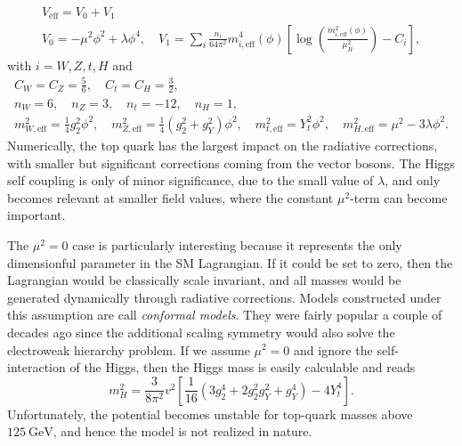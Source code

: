 \begin{equation}
\begin{gathered}
V_\text{eff} = V_0 + V_1\\
V_0 = - \mu^2 \phi^2 + \lambda \phi^4, \quad V_1 = \sum_{i} \frac{n_i}{64 \pi^2} m_{i, \text{eff}}^4(\phi) \left[ \log\! \left( \frac{m_{i, \text{eff}}^2 (\phi)}{\mu_R^2} \right) - C_i \right],
\end{gathered}
\end{equation}
with $i = W,Z, t, H$ and
\begin{equation}
\begin{gathered}
C_W = C_Z = \frac{5}{6}, \quad C_t = C_H = \frac{3}{2}, \\
n_W = 6, \quad n_Z = 3, \quad n_t = -12, \quad n_H = 1, \\
m_{W, \text{eff}}^2 = \frac{1}{4} g_2^2 \phi^2, \quad m_{Z, \text{eff}}^2 = \frac{1}{4} \left(g_2^2 + g_Y^2 \right) \phi^2, \quad m_{t, \text{eff}}^2 = Y_t^2 \phi^2, \quad m_{H, \text{eff}}^2 = \mu^2 - 3 \lambda \phi^2.
\end{gathered}
\label{eq:3:Veff_params}
\end{equation}
Numerically, the top quark has the largest impact on the radiative corrections, with smaller but significant corrections coming from the vector bosons. The Higgs self coupling is only of minor significance, due to the small value of $\lambda$, and only becomes relevant at smaller field values, where the constant $\mu^2$-term can become important.

The $\mu^2 = 0$ case is particularly interesting because it represents the only dimensionful parameter in the \acs{SM} Lagrangian. If it could be set to zero, then the Lagrangian would be classically scale invariant, and all masses would be generated dynamically through radiative corrections. Models constructed under this assumption are call \textit{conformal models}. They were fairly popular a couple of decades ago since the additional scaling symmetry would also solve the electroweak hierarchy problem. If we assume $\mu^2 = 0$ and ignore the self-interaction of the Higgs, then the Higgs mass is easily calculable and reads
\begin{equation}
m_H^2 = \frac{3}{8 \pi^2}v^2 \left[ \frac{1}{16} (3 g_2^4 + 2 g_2^2 g_Y^2 + g_Y^4) - 4 Y_t^4 \right] .
\end{equation}
Unfortunately, the potential becomes unstable for top-quark masses above $125\ \mathrm{GeV}$, and hence the model is not realized in nature.

